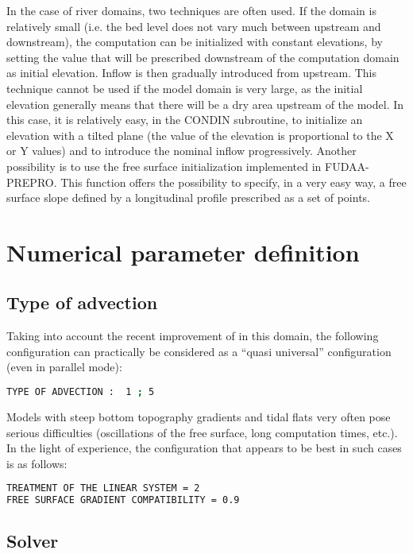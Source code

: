  In the case of river domains, two techniques are often used. If the domain is relatively small (i.e. the bed level does not vary much between upstream and downstream), the computation can be initialized with constant elevations, by setting the value that will be prescribed downstream of the computation domain as initial elevation. Inflow is then gradually introduced from upstream. This technique cannot be used if the model domain is very large, as the initial elevation generally means that there will be a dry area upstream of the model.  In this case, it is relatively easy, in the CONDIN subroutine, to initialize an elevation with a tilted plane (the value of the elevation is proportional to the X or Y values) and to introduce the nominal inflow progressively. Another possibility is to use the free surface initialization implemented in FUDAA-PREPRO. This function offers the possibility to specify, in a very easy way, a free surface slope defined by a longitudinal profile prescribed as a set of points.


\section{ Numerical parameter definition}


\subsection{ Type of advection}

 Taking into account the recent improvement of  in this domain, the following configuration can practically be considered as a ``quasi universal'' configuration (even in parallel mode):
\begin{lstlisting}[language=bash]
TYPE OF ADVECTION :  1 ; 5
\end{lstlisting}
 Models with steep bottom topography gradients and tidal flats very often pose serious difficulties (oscillations of the free surface, long computation times, etc.). In the light of experience, the configuration that appears to be best in such cases is as follows:
\begin{lstlisting}[language=bash]
TREATMENT OF THE LINEAR SYSTEM = 2
FREE SURFACE GRADIENT COMPATIBILITY = 0.9
\end{lstlisting}

\subsection{ Solver}

